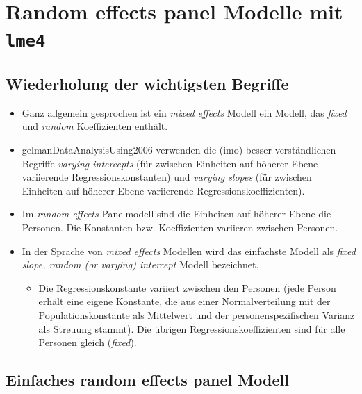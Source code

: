 \documentclass[
]{book}
\providecommand{\tightlist}{%
  \setlength{\itemsep}{0pt}\setlength{\parskip}{0pt}}
\begin{document}
\hypertarget{random-effects-panel-modelle-mit-lme4}{%
\section{\texorpdfstring{Random effects panel Modelle mit \texttt{lme4}}{Random effects panel Modelle mit lme4}}\label{random-effects-panel-modelle-mit-lme4}}

\hypertarget{wiederholung-der-wichtigsten-begriffe}{%
\subsection*{Wiederholung der wichtigsten Begriffe}\label{wiederholung-der-wichtigsten-begriffe}}

\begin{itemize}
\tightlist
\item
  Ganz allgemein gesprochen ist ein \emph{mixed effects} Modell ein Modell, das \emph{fixed} und \emph{random} Koeffizienten enthält.
\item
  gelmanDataAnalysisUsing2006 verwenden die (imo) besser verständlichen Begriffe \emph{varying intercepts} (für zwischen Einheiten auf höherer Ebene variierende Regressionskonstanten) und \emph{varying slopes} (für zwischen Einheiten auf höherer Ebene variierende Regressionskoeffizienten).
\item
  Im \emph{random effects} Panelmodell sind die Einheiten auf höherer Ebene die Personen. Die Konstanten bzw. Koeffizienten variieren zwischen Personen.
\item
  In der Sprache von \emph{mixed effects} Modellen wird das einfachste Modell als \emph{fixed slope, random (or varying) intercept} Modell bezeichnet.

  \begin{itemize}
  \tightlist
  \item
    Die Regressionskonstante variiert zwischen den Personen (jede Person erhält eine eigene Konstante, die aus einer Normalverteilung mit der Populationskonstante als Mittelwert und der personenspezifischen Varianz als Streuung stammt).
    Die übrigen Regressionskoeffizienten sind für alle Personen gleich (\emph{fixed}).
  \end{itemize}
\end{itemize}

\hypertarget{einfaches-random-effects-panel-modell}{%
\subsection*{Einfaches random effects panel Modell}\label{einfaches-random-effects-panel-modell}}
\end{document}

